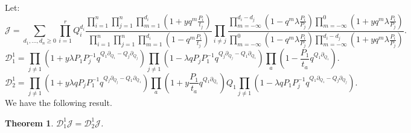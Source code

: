 \documentclass{amsart}
\newtheorem{thm}{Theorem}[section]
\begin{document}
Let:
\[
\mathcal{J}=\sum_{d_1,\dots,d_n\geq 0}\prod_{i=1}^rQ_i^{d_i}\frac{\prod_{i=1}^n\prod_{j=1}^{n}\prod_{m=1}^{d_i}(1+yq^m\frac{P_i}{t_j})}{\prod_{i=1}^n\prod_{j=1}^{n}\prod_{m=1}^{d_i}(1-q^m\frac{P_i}{t_j})}\prod_{i\neq j}\frac{\prod_{m=-\infty}^{d_i-d_j} (1-q^m\lambda\frac{P_i}{P_j})\prod_{m=-\infty}^{0} (1+yq^m\lambda\frac{P_i}{P_j})}{\prod_{m=-\infty}^{0} (1-q^m\lambda\frac{P_i}{P_j}) \prod_{m=-\infty}^{d_i-d_j} (1+yq^m\lambda\frac{P_i}{P_j})}.
\]
\[
\mathcal{D}_1^1 = \prod_{j\neq 1}(1+y\lambda P_1P_j^{-1}q^{Q_1\partial_{Q_1}-Q_j\partial_{Q_j}})\prod_{j\neq 1} (1-\lambda qP_jP_1^{-1}q^{Q_j\partial_{Q_j}-Q_1\partial_{Q_1}})\prod_a(1-\frac{P_1}{t_a}q^{Q_1\partial_{Q_1}}).
\]
\[
\mathcal{D}_2^1 = \prod_{j\neq 1} (1+y\lambda qP_jP_1^{-1}q^{Q_j\partial_{Q_j}-Q_1\partial_{Q_1}})\prod_a(1+y\frac{P_1}{t_a}q^{Q_1\partial_{Q_1}})Q_1\prod_{j\neq 1}(1-\lambda qP_1P_j^{-1}q^{Q_1\partial_{Q_1}-Q_j\partial_{Q_j}}).
\]
 We have the following result.
\begin{thm}
  $\mathcal{D}_1^1\mathcal{J} = \mathcal{D}_2^1\mathcal{J}$.  
\end{thm}
\end{document}
